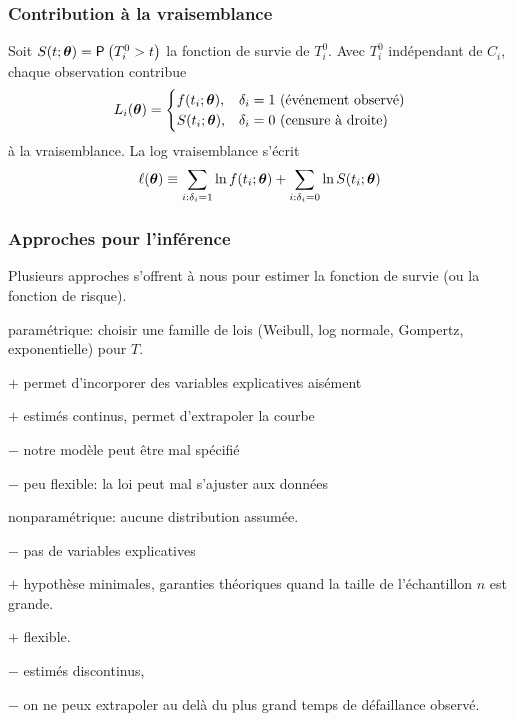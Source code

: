\documentclass{beamer}
\begin{document}
\begin{frame}
\frametitle{Contribution à la vraisemblance}
Soit $S(t; \boldsymbol {\theta}) = {\mathsf P}_{}\left(T_{i}^0 > t\right)$ la fonction de survie de $T_i^0$. Avec $T_i^0$ indépendant de $C_i$, chaque observation contribue 
\begin{align*}
L_i(\boldsymbol {\theta}) = 
\begin{cases} 
f(t_i; \boldsymbol {\theta}), & \delta_i=1 \text{ (événement observé)}\\
S(t_i; \boldsymbol {\theta}), & \delta_i=0 \text{ (censure à droite)}
\end{cases}
\end{align*}
à la vraisemblance. La log vraisemblance s'écrit 
\begin{align*}
\ell(\boldsymbol {\theta}) \equiv \sum_{i: \delta_i=1} \ln f(t_i; \boldsymbol {\theta}) + \sum_{i: \delta_i=0} \ln S(t_i; \boldsymbol {\theta})
\end{align*}

\end{frame}
\begin{frame}
\frametitle{Approches pour l'inférence}

Plusieurs approches s'offrent à nous pour estimer la fonction de survie (ou la fonction de risque).
\bi \item paramétrique: choisir une famille de lois (Weibull, log normale, Gompertz, exponentielle) pour $T$.
\bi
\item[$+$] permet d'incorporer des variables explicatives aisément
\item[$+$] estimés continus, permet d'extrapoler la courbe
\item[$-$] notre modèle peut être mal spécifié
\item[$-$] peu flexible: la loi peut mal s'ajuster aux données
\ei
\item nonparamétrique: aucune distribution assumée. 
\bi 
\item[$-$] pas de variables explicatives
\item[$+$] hypothèse minimales, garanties théoriques quand la taille de l'échantillon $n$ est grande.
\item[$+$] flexible.
\item[$-$] estimés discontinus,
\item[$-$] on ne peux extrapoler au delà du plus grand temps de défaillance observé.
\ei
\ei
\end{frame}
\end{document}
